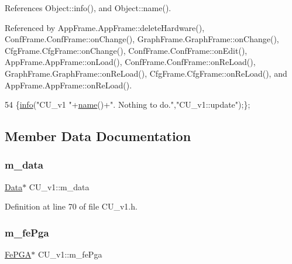 References Object\+::info(), and Object\+::name().



Referenced by App\+Frame.\+App\+Frame\+::delete\+Hardware(), Conf\+Frame.\+Conf\+Frame\+::on\+Change(), Graph\+Frame.\+Graph\+Frame\+::on\+Change(), Cfg\+Frame.\+Cfg\+Frame\+::on\+Change(), Conf\+Frame.\+Conf\+Frame\+::on\+Edit(), App\+Frame.\+App\+Frame\+::on\+Load(), Conf\+Frame.\+Conf\+Frame\+::on\+Re\+Load(), Graph\+Frame.\+Graph\+Frame\+::on\+Re\+Load(), Cfg\+Frame.\+Cfg\+Frame\+::on\+Re\+Load(), and App\+Frame.\+App\+Frame\+::on\+Re\+Load().


\begin{DoxyCode}
54 \{\hyperlink{classObject_a644fd329ea4cb85f54fa6846484b84a8}{info}(\textcolor{stringliteral}{"CU\_v1 "}+\hyperlink{classObject_a300f4c05dd468c7bb8b3c968868443c1}{name}()+\textcolor{stringliteral}{". Nothing to do."},\textcolor{stringliteral}{"CU\_v1::update"});\};
\end{DoxyCode}


\subsection{Member Data Documentation}
\mbox{\label{classCU__v1_a50b6749064da173d6a5fddf50f4398eb}} 
\subsubsection{\texorpdfstring{m\+\_\+data}{m\_data}}
{\footnotesize\ttfamily \hyperlink{classData}{Data}$\ast$ C\+U\+\_\+v1\+::m\+\_\+data\hspace{0.3cm}{\ttfamily [private]}}



Definition at line 70 of file C\+U\+\_\+v1.\+h.

\mbox{\label{classCU__v1_a1b96b95e89dbe383877b34f9b517d910}} 
\subsubsection{\texorpdfstring{m\+\_\+fe\+Pga}{m\_fePga}}
{\footnotesize\ttfamily \hyperlink{classFePGA}{Fe\+P\+GA}$\ast$ C\+U\+\_\+v1\+::m\+\_\+fe\+Pga\hspace{0.3cm}{\ttfamily [private]}}



